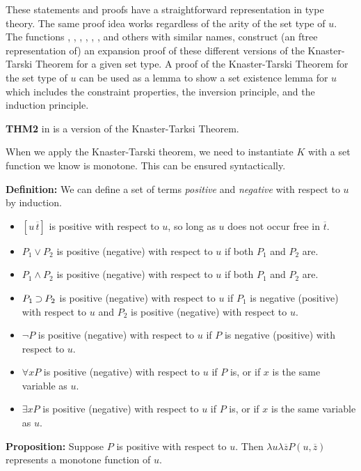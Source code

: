These statements and proofs have a straightforward representation in
type theory.  The same proof idea works regardless of the arity of the
set type of $u$.  The functions ,
, 
,
, 
,
,
and others with similar names,
construct (an ftree representation of) an expansion proof of
these different versions of the Knaster-Tarski Theorem
for a given set type.
A proof of the Knaster-Tarski Theorem for the set type of $u$ can be used as a lemma
to show a set existence lemma for $u$ which includes the constraint properties,
the inversion principle, and the induction principle.

{\bf THM2} in \TPS is a version of the Knaster-Tarksi Theorem.

When we apply the Knaster-Tarski theorem, we need to instantiate
$K$ with a set function we know is monotone.  This can be ensured
syntactically.

{\bf Definition:}  We can define a set of terms {\it positive} and
{\it negative} with respect to $u$ by induction.
\begin{itemize}
\item $[u\,\overline{t}]$ is positive with respect to $u$, so long as
$u$ does not occur free in $\overline{t}$.
\item $P_1 \lor P_2$ is positive (negative) with respect to $u$ if both $P_1$ and $P_2$ are.
\item $P_1 \land P_2$ is positive (negative) with respect to $u$ if both $P_1$ and $P_2$ are.
\item $P_1 \mathbin{\supset} P_2$ is positive (negative) with respect to $u$ if $P_1$ 
is negative (positive) with respect to $u$ and $P_2$
is positive (negative) with respect to $u$.
\item $\lnot P$ is positive (negative) with respect to $u$ if
$P$ is negative (positive) with respect to $u$.
\item $\forall x P$ is positive (negative) with respect to $u$ if
$P$ is, or if $x$ is the same variable as $u$.
\item $\exists x P$ is positive (negative) with respect to $u$ if
$P$ is, or if $x$ is the same variable as $u$.
\end{itemize}

{\bf Proposition:} Suppose $P$ is positive with respect to $u$.
Then $\lambda u\lambda \overline{z} P(u,\overline{z})$
represents a monotone function of $u$.


